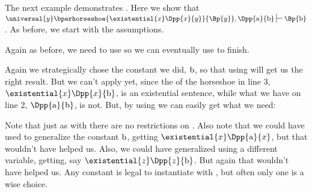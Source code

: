 The next example demonstrates . Here we show that $\universal{\variable{y}}\bparhorseshoe{\existential{\variable{x}}\Dpp{\variable{x}}{\variable{y}}}{\Bp{\variable{y}}},\Dpp{\constant{a}}{\constant{b}}\sststile{}{}\Bp{\constant{b}}$.
As before, we start with the assumptions.
\begin{gproof}[\label{GQDExampleD}]
\end{gproof}
Again as before, we need to use  so we can eventually use  to finish. 
\begin{gproof}[\label{GQDExampleE}]
\end{gproof}
Again we strategically chose the constant we did, $\mathrm{b}$, so that using  will get us the right result. 
But we can't apply  yet, since the  of the horseshoe in line 3, $\existential{\variable{x}}\Dpp{\variable{x}}{\constant{b}}$, is an existential sentence, while what we have on line 2, $\Dpp{\constant{a}}{\constant{b}}$, is not. 
But, by using  we can easily get what we need:
\begin{gproof}[\label{GQDExampleF}]
\end{gproof}
Note that just as with  there are no restrictions on .
Also note that we could have used  to generalize the constant $\mathrm{b}$, getting $\existential{\variable{x}}\Dpp{\constant{a}}{\variable{x}}$, but that wouldn't have helped us.
Also, we could have generalized using a different variable, getting, say $\existential{\variable{z}}\Dpp{\variable{z}}{\constant{b}}$.
But again that wouldn't have helped us. 
Any constant is legal to instantiate with , but often only one is a wise choice.

